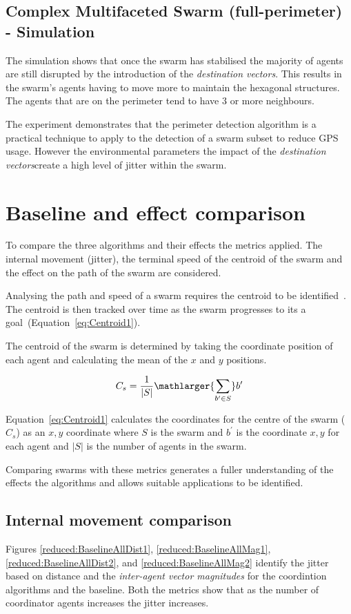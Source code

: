 \documentclass{ieeeaccess}
\begin{document}
\subsection{Complex Multifaceted Swarm (full-perimeter) - Simulation}
The simulation shows that once the swarm has stabilised the majority of agents are still disrupted by the introduction of the \textit{destination vectors}. This results in the swarm's agents having to move more to maintain the hexagonal structures. The agents that are on the perimeter tend to have 3 or more neighbours. 

The experiment demonstrates that the perimeter detection algorithm is a practical technique to apply to the detection of a swarm subset to reduce GPS usage. However the environmental parameters the impact of the \textit{destination vectors}create a high level of jitter within the swarm.

\section{Baseline and effect comparison\label{section:compareBaselineAll1}}
To compare the three algorithms and their effects the metrics applied. The internal movement (jitter), the terminal speed of the centroid of the swarm and the effect on the path of the swarm are considered. 

Analysing the path and speed of a swarm requires the centroid to be identified~\cite{HAY:08,VG:05,GP:02,GP:04,GP:04a,GP:05,GP:11}. The centroid is then tracked over time as the swarm progresses to its a goal~(Equation~\ref{eq:Centroid1}).

The centroid of the swarm is determined by taking the coordinate position of each agent and calculating the mean of the $x$ and $y$ positions.

\begin{equation}\label{eq:Centroid1}
C_s = \frac{1}{|S|}\mathlarger{\sum_{b' \in S}} b'
\end{equation}

Equation~\ref{eq:Centroid1} calculates the coordinates for the centre of the swarm ($C_s$) as an $x,y$ coordinate where $S$ is the swarm and $b^{'}$ is the coordinate $x,y$ for each agent and $|S|$ is the number of agents in the swarm.

Comparing swarms with these metrics generates a fuller understanding of the effects the algorithms and allows suitable applications to be identified.

\subsection{Internal movement comparison\label{section:stabilityComparison1}}
Figures \ref{reduced:BaselineAllDist1}, \ref{reduced:BaselineAllMag1}, \ref{reduced:BaselineAllDist2}, and \ref{reduced:BaselineAllMag2} identify the jitter based on distance and the \textit{inter-agent vector magnitudes} for the coordintion algorithms and the baseline. Both the metrics show that as the number of coordinator agents increases the jitter increases. 
\end{document}
